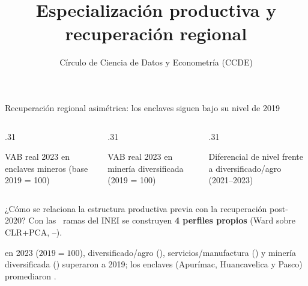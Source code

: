 \documentclass[aspectratio=169,11pt]{beamer}
\title{Especialización productiva y recuperación regional}
\author{Círculo de Ciencia de Datos y Econometría (CCDE)}
\date{}
\begin{document}

\begin{frame}[t]{Recuperación regional asimétrica: los enclaves siguen bajo su nivel de 2019}
\vspace{.03cm}
\begin{columns}[T,onlytextwidth]
\begin{column}{.31\textwidth}\begin{keybox}[equal height group=g2,top=1.3mm,bottom=1.3mm]\textcolor{warn}{\fontsize{28}{31}\selectfont\bfseries \EnclaveFinal}\par\vspace{.06cm}\small VAB real 2023 en enclaves mineros (base 2019 = 100)\end{keybox}\end{column}
\begin{column}{.31\textwidth}\begin{keybox}[equal height group=g2,top=1.3mm,bottom=1.3mm]\textcolor{purplex}{\fontsize{28}{31}\selectfont\bfseries \MiningFinal}\par\vspace{.06cm}\small VAB real 2023 en minería diversificada (2019 = 100)\end{keybox}\end{column}
\begin{column}{.31\textwidth}\begin{keybox}[equal height group=g2,top=1.3mm,bottom=1.3mm]\textcolor{warn}{\fontsize{28}{31}\selectfont\bfseries \ScarBeta}\par\vspace{.06cm}\small Diferencial de nivel frente a diversificado/agro (2021--2023)\end{keybox}\end{column}
\end{columns}
\vspace{.06cm}
\begin{simplebox}
 ¿Cómo se relaciona la estructura productiva previa con la recuperación post-2020? Con las \Sectors\ ramas del INEI se construyen \textbf{4 perfiles propios} (Ward sobre CLR+PCA, \PreStart--\PreEnd).\par\vspace{.02cm}
 en 2023 ($2019=100$), diversificado/agro (\AgroFinal), servicios/manufactura (\ServicesFinal) y minería diversificada (\MiningFinal) superaron a 2019; los enclaves (Apurímac, Huancavelica y Pasco) promediaron \EnclaveFinal.
\end{simplebox}
\end{frame}
\end{document}
